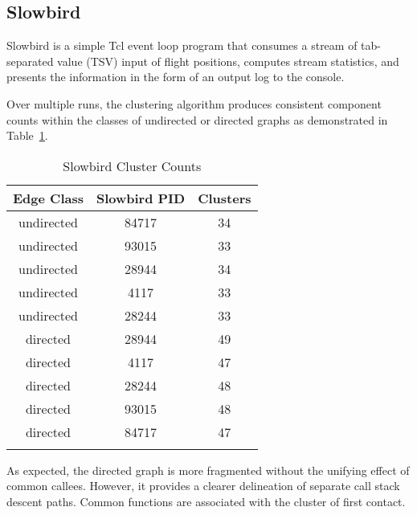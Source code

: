 \documentclass{article}[letter,10pt]
\begin{document}
{{    \subsection{Slowbird}{
      Slowbird is a simple Tcl event loop program that consumes a stream of tab-separated value (TSV) input of flight
      positions, computes stream statistics, and presents the information in the form of an output log to the console.

      Over multiple runs, the clustering algorithm produces consistent component counts within the classes of undirected
      or directed graphs as demonstrated in Table~\ref{tbl:slowbirdclcts}.
      {\footnotesize
      \begin{longtable}{c c c}
        Edge Class & Slowbird PID & Clusters \\
        \endhead
        \hline
        undirected & 84717  & 34 \\
        undirected & 93015  & 33 \\
        undirected & 28944  & 34 \\
        undirected & 4117  & 33 \\
        undirected & 28244  & 33 \\
        \hline
        directed & 28944  & 49 \\
        directed & 4117  & 47 \\
        directed & 28244  & 48 \\
        directed & 93015  & 48 \\
        directed & 84717  & 47 \\
        \hline
        \caption{Slowbird Cluster Counts}
        \label{tbl:slowbirdclcts}
      \end{longtable}}
      As expected, the directed graph is more fragmented without the unifying effect of common callees. However, it provides
      a clearer delineation of separate call stack descent paths. Common functions are associated with the cluster of first contact.

}}}
\end{document}

